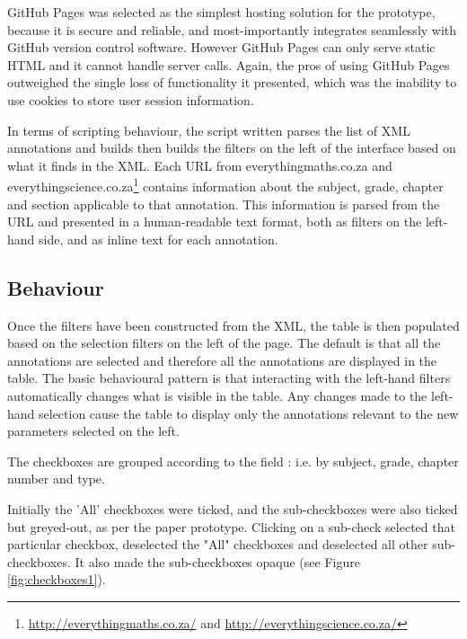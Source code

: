 GitHub Pages was selected as the simplest hosting solution for the prototype, because it is secure and reliable, and most-importantly integrates seamlessly with GitHub version control software. However GitHub Pages can only serve static HTML and it cannot handle server calls. Again, the pros of using GitHub Pages outweighed the single loss of functionality it presented, which was the inability to use cookies to store user session information. 


In terms of scripting behaviour, the script written parses the list of XML annotations and builds then builds the filters on the left of the interface based on what it finds in the XML. Each URL from everythingmaths.co.za and everythingscience.co.za\footnote{\href{http://everythingmaths.co.za/}{http://everythingmaths.co.za/} and \href{http://everythingscience.co.za/}{http://everythingscience.co.za/}} contains information about the subject, grade, chapter and section applicable to that annotation. This information is parsed from the URL and presented in a human-readable text format, both as filters on the left-hand side, and as inline text for each annotation. 

\subsection{Behaviour}
Once the filters have been constructed from the XML, the table is then populated based on  the selection filters on the left of the page. The default is that all the annotations are selected and therefore all the annotations are displayed in the table. The basic behavioural pattern is that interacting with the left-hand filters automatically changes what is visible in the table. Any changes made to the left-hand selection cause the table to display only the annotations relevant to the new parameters selected on the left. 

The checkboxes are grouped according to the field \citep[p. 439]{Galitz}: i.e. by subject, grade, chapter number and type. 

Initially the 'All' checkboxes were ticked, and the sub-checkboxes were also ticked but greyed-out, as per the paper prototype. Clicking on a sub-check selected that particular checkbox, deselected the "All" checkboxes and deselected all other sub-checkboxes. It also made the sub-checkboxes opaque (see Figure \ref{fig:checkboxes1}). 

